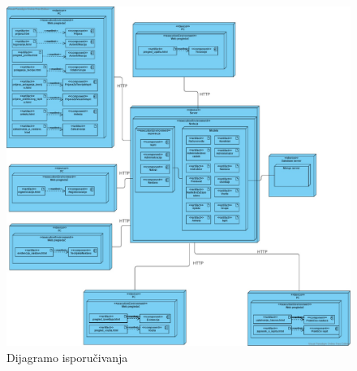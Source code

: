 \begin{figure}[H]
    \begin{center}
        \includegraphics[width=\textwidth]{Diagrams/dijagram_isporucivanja.jpeg}
    \end{center}
    \caption {Dijagramo isporučivanja}
    \label{dijagram_isporučivanja}
  
  \end{figure}
